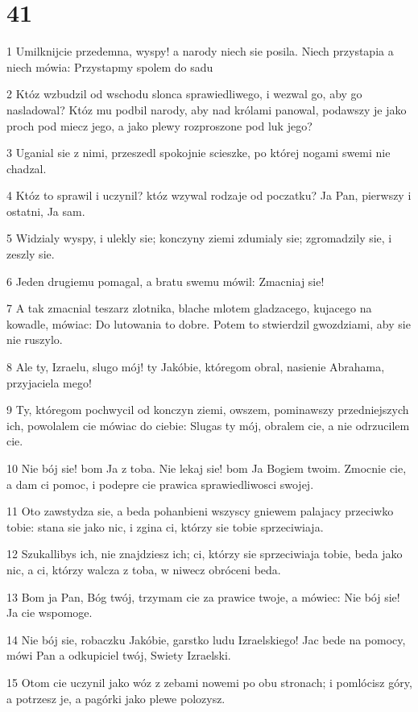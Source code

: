 \chapter{41}

\par 1 Umilknijcie przedemna, wyspy! a narody niech sie posila. Niech przystapia a niech mówia: Przystapmy spolem do sadu
\par 2 Któz wzbudzil od wschodu slonca sprawiedliwego, i wezwal go, aby go nasladowal? Któz mu podbil narody, aby nad królami panowal, podawszy je jako proch pod miecz jego, a jako plewy rozproszone pod luk jego?
\par 3 Uganial sie z nimi, przeszedl spokojnie scieszke, po której nogami swemi nie chadzal.
\par 4 Któz to sprawil i uczynil? któz wzywal rodzaje od poczatku? Ja Pan, pierwszy i ostatni, Ja sam.
\par 5 Widzialy wyspy, i ulekly sie; konczyny ziemi zdumialy sie; zgromadzily sie, i zeszly sie.
\par 6 Jeden drugiemu pomagal, a bratu swemu mówil: Zmacniaj sie!
\par 7 A tak zmacnial teszarz zlotnika, blache mlotem gladzacego, kujacego na kowadle, mówiac: Do lutowania to dobre. Potem to stwierdzil gwozdziami, aby sie nie ruszylo.
\par 8 Ale ty, Izraelu, slugo mój! ty Jakóbie, któregom obral, nasienie Abrahama, przyjaciela mego!
\par 9 Ty, któregom pochwycil od konczyn ziemi, owszem, pominawszy przedniejszych ich, powolalem cie mówiac do ciebie: Slugas ty mój, obralem cie, a nie odrzucilem cie.
\par 10 Nie bój sie! bom Ja z toba. Nie lekaj sie! bom Ja Bogiem twoim. Zmocnie cie, a dam ci pomoc, i podepre cie prawica sprawiedliwosci swojej.
\par 11 Oto zawstydza sie, a beda pohanbieni wszyscy gniewem palajacy przeciwko tobie: stana sie jako nic, i zgina ci, którzy sie tobie sprzeciwiaja.
\par 12 Szukallibys ich, nie znajdziesz ich; ci, którzy sie sprzeciwiaja tobie, beda jako nic, a ci, którzy walcza z toba, w niwecz obróceni beda.
\par 13 Bom ja Pan, Bóg twój, trzymam cie za prawice twoje, a mówiec: Nie bój sie! Ja cie wspomoge.
\par 14 Nie bój sie, robaczku Jakóbie, garstko ludu Izraelskiego! Jac bede na pomocy, mówi Pan a odkupiciel twój, Swiety Izraelski.
\par 15 Otom cie uczynil jako wóz z zebami nowemi po obu stronach; i pomlócisz góry, a potrzesz je, a pagórki jako plewe polozysz.
